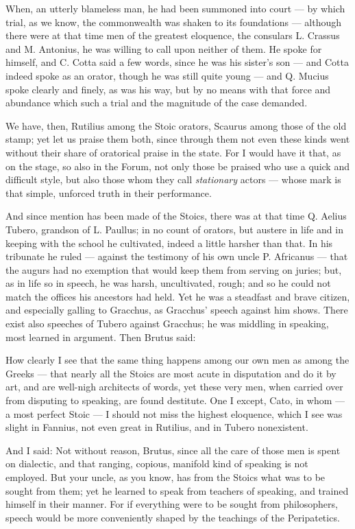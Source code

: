  When, an utterly blameless man, he had been summoned into court — by which trial, as we know, the commonwealth was shaken to its foundations — although there were at that time men of the greatest eloquence, the consulars L. Crassus and M. Antonius, he was willing to call upon neither of them. He spoke for himself, and C. Cotta said a few words, since he was his sister's son — and Cotta indeed spoke as an orator, though he was still quite young — and Q. Mucius spoke clearly and finely, as was his way, but by no means with that force and abundance which such a trial and the magnitude of the case demanded.

 We have, then, Rutilius among the Stoic orators, Scaurus among those of the old stamp; yet let us praise them both, since through them not even these kinds went without their share of oratorical praise in the state. For I would have it that, as on the stage, so also in the Forum, not only those be praised who use a quick and difficult style, but also those whom they call \textit{stationary} actors — whose mark is that simple, unforced truth in their performance.

 And since mention has been made of the Stoics, there was at that time Q. Aelius Tubero, grandson of L. Paullus; in no count of orators, but austere in life and in keeping with the school he cultivated, indeed a little harsher than that. In his tribunate he ruled — against the testimony of his own uncle P. Africanus — that the augurs had no exemption that would keep them from serving on juries; but, as in life so in speech, he was harsh, uncultivated, rough; and so he could not match the offices his ancestors had held. Yet he was a steadfast and brave citizen, and especially galling to Gracchus, as Gracchus' speech against him shows. There exist also speeches of Tubero against Gracchus; he was middling in speaking, most learned in argument. Then Brutus said:

 How clearly I see that the same thing happens among our own men as among the Greeks — that nearly all the Stoics are most acute in disputation and do it by art, and are well-nigh architects of words, yet these very men, when carried over from disputing to speaking, are found destitute. One I except, Cato, in whom — a most perfect Stoic — I should not miss the highest eloquence, which I see was slight in Fannius, not even great in Rutilius, and in Tubero nonexistent.

 And I said: Not without reason, Brutus, since all the care of those men is spent on dialectic, and that ranging, copious, manifold kind of speaking is not employed. But your uncle, as you know, has from the Stoics what was to be sought from them; yet he learned to speak from teachers of speaking, and trained himself in their manner. For if everything were to be sought from philosophers, speech would be more conveniently shaped by the teachings of the Peripatetics.

